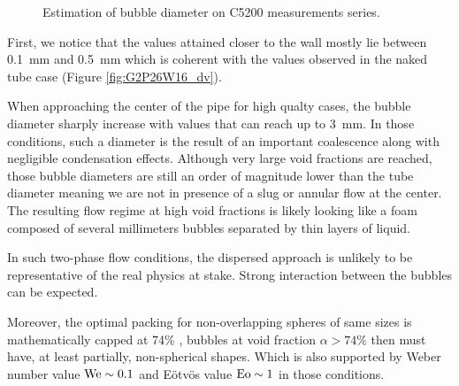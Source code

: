 \begin{figure}[!h]
\centering
{}

\caption{Estimation of bubble diameter on C5200 measurements series.}
\label{fig:exp_C52_dvap}
\end{figure}

\npar

First, we notice that the values attained closer to the wall mostly lie between 0.1\ mm and 0.5\ mm which is coherent with the values observed in the naked tube case (Figure \ref{fig:G2P26W16_dv}).

\npar

When approaching the center of the pipe for high qualty cases, the bubble diameter sharply increase with values that can reach up to 3\ mm. In those conditions, such a diameter is the result of an important coalescence along with negligible condensation effects. Although very large void fractions are reached, those bubble diameters are still an order of magnitude lower than the tube diameter meaning we are not in presence of a slug or annular flow at the center. The resulting flow regime at high void fractions is likely looking like a foam composed of several millimeters bubbles separated by thin layers of liquid.

\begin{remark*}{}
In such two-phase flow conditions, the dispersed approach is unlikely to be representative of the real physics at stake. Strong interaction between the bubbles can be expected. %

\npar

Moreover, the optimal packing for non-overlapping spheres of same sizes is mathematically capped at 74\% \cite{wu_bulk_2003}, bubbles at void fraction $\alpha > 74\%$ then must have, at least partially, non-spherical shapes. Which is also supported by Weber number value $\mathrm{We} \sim 0.1$ and E\"otv\"os value $\mathrm{Eo} \sim 1$ in those conditions.
\end{remark*}

